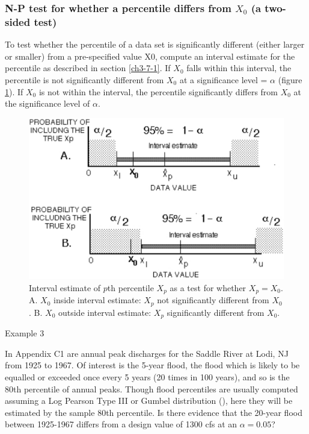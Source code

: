 \documentclass[]{book}
\begin{document}
\hypertarget{n-p-test-for-whether-a-percentile-differs-from-x_0-a-two-sided-test}{%
\subsubsection{\texorpdfstring{N-P test for whether a percentile differs from \(X_{0}\) (a two-sided test)}{N-P test for whether a percentile differs from X\_\{0\} (a two-sided test)}}\label{n-p-test-for-whether-a-percentile-differs-from-x_0-a-two-sided-test}}

To test whether the percentile of a data set is significantly different (either larger or smaller) from a pre-specified value X0, compute an interval estimate for the percentile as described in section \ref{ch3-7-1}. If \(X_{0}\) falls within this interval, the percentile is not significantly different from \(X_{0}\) at a significance level = \(\alpha\) (figure \ref{fig:fig-3-9}). If \(X_{0}\) is not within the interval, the percentile significantly differs from \(X_{0}\) at the significance level of \(\alpha\).

\begin{figure}

{\centering \includegraphics[width=14.15in]{figures/3_9} 

}

\caption{Interval estimate of $p$th percentile $X_{p}$ as a test for whether $X_{p} = X_{0}$.
A. $X_{0}$ inside interval estimate: $X_{p}$ not significantly different from $X_{0}$.
B. $X_{0}$ outside interval estimate: $X_{p}$ significantly different from $X_{0}$.}\label{fig:fig-3-9}
\end{figure}

Example 3

In Appendix C1 are annual peak discharges for the Saddle River at Lodi, NJ from 1925 to 1967. Of interest is the 5-year flood, the flood which is likely to be equalled or exceeded once every 5 years (20 times in 100 years), and so is the 80th percentile of annual peaks. Though flood percentiles are usually computed assuming a Log Pearson Type III or Gumbel distribution (\citet{ponce_engineering_1989}), here they will be estimated by the sample 80th percentile. Is there evidence that the 20-year flood between 1925-1967 differs from a design value of 1300 cfs at an \(\alpha = 0.05\)?
\end{document}
